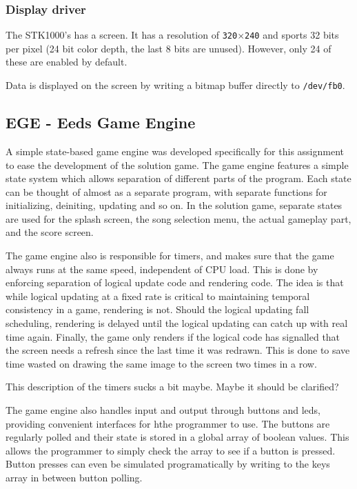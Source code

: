 \subsubsection{Display driver}
The STK1000's has a screen.
It has a resolution of \texttt{320}$\times$\texttt{240} and sports 32 bits per pixel (24 bit color depth, the last 8 bits are unused)\cite{lab-compendium}.
However, only 24 of these are enabled by default\cite{avr32-disp}.

Data is displayed on the screen by writing a bitmap buffer directly to \texttt{/dev/fb0}.


        \subsection{EGE  - Eeds Game Engine}

    A simple state-based game engine was developed specifically for this assignment to ease the development of the solution game.
    The game engine features a simple state system which allows separation of different parts of the program.
    Each state can be thought of almost as a separate program, with separate functions for initializing, deiniting, updating and so on.
    In the solution game, separate states are used for the splash screen, the song selection menu, the actual gameplay part, and the score screen.

    The game engine also is responsible for timers, and makes sure that the game always runs at the same speed, independent of CPU load.
    This is done by enforcing separation of logical update code and rendering code.
    The idea is that while logical updating at a fixed rate is critical to maintaining temporal consistency in a game, rendering is not.
    Should the logical updating fall scheduling, rendering is delayed until the logical updating can catch up with real time again.
    Finally, the game only renders if the logical code has signalled that the screen needs a refresh since the last time it was redrawn. This is done to save time wasted on drawing the same image to the screen two times in a row.

    This description of the timers sucks a bit maybe. Maybe it should be clarified?


    The game engine also handles input and output through buttons and leds, providing convenient interfaces for hthe programmer to use.
    The buttons are regularly polled and their state is stored in a global array of boolean values.
    This allows the programmer to simply check the array to see if a button is pressed.
    Button presses can even be simulated programatically by writing to the keys array in between button polling.




